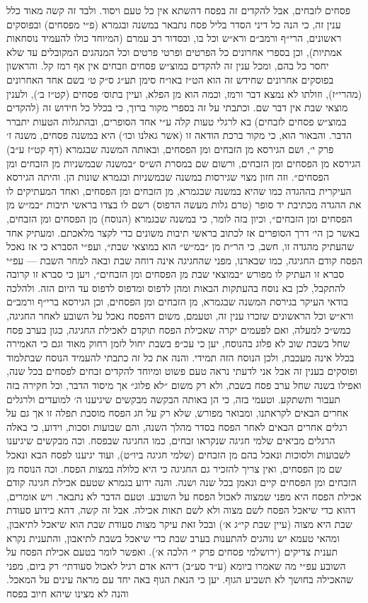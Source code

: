 \documentclass[12pt, openany]{book}
\begin{document}
פסחים לזבחים, אבל להקדים זה בפסח דהשתא אין כל טעם ויסוד.  ולבד זה קשה מאוד כלל ענין זה, כי הנה כל דיני הסדר בליל פסח נתבאר במשנה ובגמרא (פ״י מפסחים) ובפוסקים ראשונים, הרי״ף ורמב״ם ורא״ש וכל בו, ובסדור רב עמרם (המיוחד כולו להעמיד נוסחאות אמתיות), וכן בספרי אחרונים כל הפרטים ופרטי פרטים וכל המנהגים המקובלים עד שלא יחסר כל בהם, ומכל ענין זה להקדים במוצ״ש פסחים וזבחים אין אף רמז קל. והראשון בפוסקים אחרונים שחידש זה הוא הט״ז באו״ח סימן תע״ג ס״ק ט׳ בשם אחד האחרונים (מהרי״ז), וזולתו לא נמצא דבר ורמז, וכמה הוא מן הפלא, ועיין בתוס׳ פסחים (קט״ז ב׳), ולענין מוצאי שבת אין דבר שם. וכתבתי על זה בספרי מקור ברוך, כי בכלל כל חידוש זה (להקדים במוצ״ש פסחים לזבחים) בא לרגלי טעות קלה ע״י אחד הסופרים, ובהתגלות הטעות יתברר הדבר. והבאור הוא, כי מקור ברכת הודאה זו (אשר גאלנו וכו׳) היא במשנה פסחים, משנה ז׳ פרק י׳, ושם הגירסא מן הזבחים ומן הפסחים, ובאותה המשנה שבגמרא (דף קט״ז ע״ב) הגירסא מן הפסחים ומן הזבחים, ורשום שם במסרת הש״ס ״במשנה שבמשניות מן הזבחים ומן הפסחים״. וזה חזון מצוי שגירסות במשנה שבמשניות ובגמרא שונות הן. והיתה הגירסא העיקרית בההגדה כמו שהיא במשנה שבגמרא, מן הזבחים ומן הפסחים, ואחד המעתיקים לו את ההגדה מכתיבת יד סופר (טרם גלות מעשה הדפוס) רשם לו בצדו בראשי תיבות ״במ״ש מן הפסחים ומן הזבחים״, וכיון בזה לומר, כי במשנה שבגמרא (הנוסח) מן הפסחים ומן הזבחים, באשר כן הי׳ דרך הסופרים אז לכתוב בראשי תיבות משונים כדי לקצר מלאכתם. ומעתיק אחד שהעתיק מהגדה זו, חשב, כי הר״ת מן ״במ״ש״ הוא במוצאי שבת״, ועפ״י הסברא כי אז נאכל הפסח קודם החגיגה, כמו שבארנו, מפני שהחגיגה אינה דוחה שבת ובאה למחר השבת — עפ״י סברא זו העתיק לו מפורש ״במוצאי שבת מן הפסחים ומן הזבחים״, ויען כי סברא זו קרובה להתקבל, לכן בא נוסח בהעתקות הבאות ומהן לדפוס ומדפוס לדפוס עד היום הזה. ולהלכה בודאי העיקר בגירסת המשנה שבגמרא, מן הזבחים ומן הפסחים, וכן הגירסא ברי״ף ורמב״ם ורא״ש וכל הראשונים שזכרו ענין זה, וטעמם, משום דהפסח נאכל על השובע לאחר החגיגה, כמש״כ למעלה, ואם לפעמים יקרה שאכילת הפסח תוקדם לאכילת החגיגה, כגון בערב פסח שחל בשבת שוב לא פלוג בהנוסח,  יען כי עכ״פ בשבת יחול לזמן רחוק מאוד וגם כי האמירה בכלל אינה מעכבת, ולכן הנוסח הזה תמידי. והנה את כל זה כתבתי להעמיד הנוסח שבתלמוד ופוסקים בענין זה אבל אני לדעתי נראה טעם פשוט ומיוחד להקדים זבחים לפסחים בכל שנה, ואפילו בשנה שחל ערב פסח בשבת, ולא רק משום ״לא פלוג״ אך מיסוד הדבר, וכל חקירה בזה תעבור ותשתקע. וטעמי בזה, כי הן באותה הבקשה מבקשים שיגיענו ה׳ למועדים ולרגלים אחרים הבאים לקראתנו, ומבואר מפורש, שלא רק על חג הפסח מוסבת תפלה זו אך גם על רגלים אחרים הבאים לאחר הפסח בסדר מהלך השנה, והם שבועות וסכות, וידוע, כי באלה הרגלים מביאים שלמי חגיגה שנקראו זבחים, כמו החגיגה שבפסח. וכה מבקשים שיגיענו לשבועות ולסוכות ונאכל בהם מן הזבחים (שלמי חגיגה ביו״ט), ועוד יגיענו לפסח הבא ונאכל שם מן הפסחים, ואין צריך להזכיר גם החגיגה כי היא כלולה במצות הפסח. וכה הנוסח מן הזבחים ומן הפסחים קיים ונאמן בכל שנה ושנה. והנה ידוע בגמרא שטעם אכילת חגיגה קודם אכילת הפסח היא מפני שמצוה לאכול הפסח על השובע. וטעם הדבר לא נתבאר. ויש אומרים, דהוא כדי שיאכל הפסח לשם מצוה ולא לשם תאות אכילה. אבל זה קשה, דהא כידוע סעודת שבת היא מצוה (עיין שבת קי״ג א׳) ובכל זאת עיקר מצות סעודת שבת הוא שיאכל לתיאבון, ומהאי טעמא יש נוהגים להתענות בערב שבת כדי שיאכל בשבת לתיאבון, והתענית נקרא תענית צדיקים (ירושלמי פסחים פרק י׳ הלכה א׳).  ואפשר לומר בטעם אכילת הפסח על השובע עפ״י מה שאמרו ביומא (ע״ד סע״ב) דיהא אדם רגיל לאכול סעודתי׳ רק ביום, מפני שהאכילה בחושך לא תשביע הגוף. יען כי הנאת הגוף באה יחד עם מראה עינים על המאכל. והנה לא מצינו שיהא חיוב בפסח 
\end{document}
